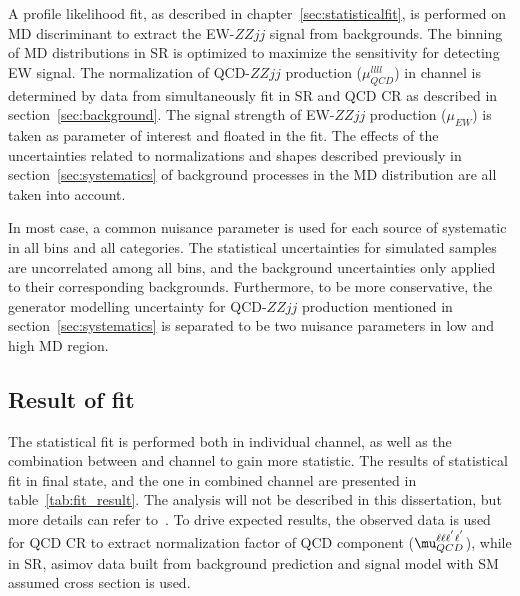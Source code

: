 A profile likelihood fit, as described in chapter~\ref{sec:statisticalfit}, is performed on MD discriminant to extract the EW-$ZZjj$ signal from backgrounds.
The binning of MD distributions in SR is optimized to maximize the sensitivity for detecting EW signal.
The normalization of QCD-$ZZjj$ production ($\mu_{QCD}^{llll}$) in \llll channel is determined by data from simultaneously fit in SR and QCD CR as described in section~\ref{sec:background}.
The signal strength of EW-$ZZjj$ production ($\mu_{EW}$) is taken as parameter of interest and floated in the fit.
The effects of the uncertainties related to normalizations and shapes described previously in section~\ref{sec:systematics} 
of background processes in the MD distribution are all taken into account.

In most case, a common nuisance parameter is used for each source of systematic in all bins and all categories.
The statistical uncertainties for simulated samples are uncorrelated among all bins, and the background uncertainties only applied to their corresponding backgrounds.
Furthermore, to be more conservative, the generator modelling uncertainty for QCD-$ZZjj$ production mentioned in section~\ref{sec:systematics}
is separated to be two nuisance parameters in low and high MD region.

\subsection{Result of fit}

The statistical fit is performed both in individual \llll channel, as well as the combination between \llll and \llvv channel to gain more statistic.
The results of statistical fit in \llll final state, 
and the one in combined channel are presented in table~\ref{tab:fit_result}.
The \llvv analysis will not be described in this dissertation, but more details can refer to~\cite{ATLAS:2019vrv}.
To drive expected results, the observed data is used for QCD CR to extract normalization factor of QCD component ($\mu_{QCD}^{\llll}$),
while in SR, asimov data built from background prediction and signal model with SM assumed cross section is used.

